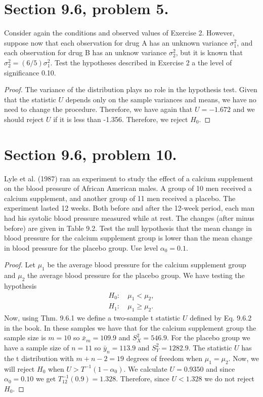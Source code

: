 \documentclass{article}
\newenvironment{hwproof}[1]
{
    #1
    \begin{proof}
}{
    \end{proof}
}
\begin{document}
\section{Section 9.6, problem 5.}
\begin{hwproof}
    {
        Consider again the conditions and observed values of Exercise 2. However,
        suppose now that each observation for drug A has an unknown variance
        $\sigma_1^2$, and each observation for drug B has an unknow variance
        $\sigma_2^2$, but it is known that $\sigma_2^2 = (6/5)\sigma_1^2$. Test the
        hypotheses described in Exercise 2 a the level of significance 0.10.
    }
    The variance of the distribution plays no role in the hypothesis test. Given that the
    statistic $U$ depends only on the sample variances and means, we have no need
    to change the procedure. Therefore, we have again that $U = -1.672$ and
    we should reject $U$ if it is less than -1.356. Therefore, we reject $H_0$.
\end{hwproof}

\section{Section 9.6, problem 10.}
\begin{hwproof}
    {
        Lyle et al. (1987) ran an experiment to study the effect of a calcium supplement
        on the blood pressure of African American males. A group of 10 men received a
        calcium supplement, and another group of 11 men received a placebo. The
        experiment lasted 12 weeks. Both before and after the 12-week period, each man had
        his systolic blood pressure measured while at rest. The changes (after minus
        before) are given in Table 9.2. Test the null hypothesis that the mean change
        in blood pressure for the calcium supplement group is lower than the mean change
        in blood pressure for the placebo group. Use level $\alpha_0 = 0.1$.
    }
    Let $\mu_1$ be the average blood pressure for the calcium supplement group
    and $\mu_2$ the average blood pressure for the placebo group.
    We have testing the hypothesis
    \begin{align*}
        H_0: & \ \mu_1 < \mu_2,    \\
        H_1: & \ \mu_1 \geq \mu_2.
    \end{align*}
    Now, using Thm. 9.6.1 we define a two-sample t statistic $U$ defined by
    Eq. 9.6.2 in the book. In these samples we have that for the calcium supplement group
    the sample size is $m = 10$ so $\bar{x}_m = 109.9$ and $S_X^2 = 546.9$.
    For the placebo group we have a sample size of $n=11$ so $\bar{y}_n = 113.9$ and
    $S_Y^2 = 1282.9$. The
    statistic $U$ has the t distribution with $m + n -2 = 19$ degrees of freedom
    when $\mu_1 = \mu_2$. Now, we will reject $H_0$ when $U > T^{-1}(1 - \alpha_0)$.
    We calculate $U = 0.9350$ and since $\alpha_0 = 0.10$ we get
    $T_{12}^{-1}(0.9) = 1.328$. Therefore, since $U < 1.328$ we do not reject $H_0$.
\end{hwproof}
\end{document}

